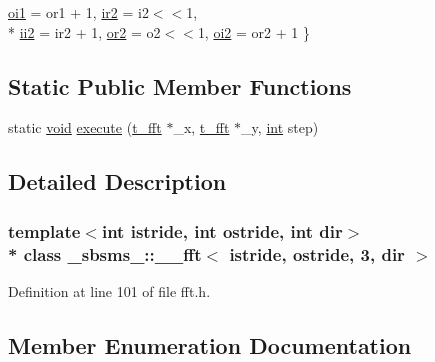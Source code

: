 \begin{DoxyCompactItemize}
\hyperlink{class__sbsms___1_1____fft_3_01istride_00_01ostride_00_013_00_01dir_01_4_a0eb5f1fdad137cbe9f2343823af3d271a56a14245903d6df0535b7a9f4fef7130}{oi1} = or1 + 1, 
\hyperlink{class__sbsms___1_1____fft_3_01istride_00_01ostride_00_013_00_01dir_01_4_a0eb5f1fdad137cbe9f2343823af3d271a440e0b07fe99cb841fff4e5fcd5d6a97}{ir2} = i2$<$$<$1, 
\\*
\hyperlink{class__sbsms___1_1____fft_3_01istride_00_01ostride_00_013_00_01dir_01_4_a0eb5f1fdad137cbe9f2343823af3d271a73def70a027fa8bf4473fa9ba34619a4}{ii2} = ir2 + 1, 
\hyperlink{class__sbsms___1_1____fft_3_01istride_00_01ostride_00_013_00_01dir_01_4_a0eb5f1fdad137cbe9f2343823af3d271a120f14705b7aa375238363a9d0d41ce9}{or2} = o2$<$$<$1, 
\hyperlink{class__sbsms___1_1____fft_3_01istride_00_01ostride_00_013_00_01dir_01_4_a0eb5f1fdad137cbe9f2343823af3d271aef8933758f3d4456b58bdbdca0ada200}{oi2} = or2 + 1
 \}
\end{DoxyCompactItemize}
\subsection*{Static Public Member Functions}
\begin{DoxyCompactItemize}
\item 
static \hyperlink{sound_8c_ae35f5844602719cf66324f4de2a658b3}{void} \hyperlink{class__sbsms___1_1____fft_3_01istride_00_01ostride_00_013_00_01dir_01_4_af43801124bd8c16f31037448e3ad1558}{execute} (\hyperlink{namespace__sbsms___af5c6f976b2da21c36853e3b0c5995a54}{t\+\_\+fft} $\ast$\+\_\+x, \hyperlink{namespace__sbsms___af5c6f976b2da21c36853e3b0c5995a54}{t\+\_\+fft} $\ast$\+\_\+y, \hyperlink{xmltok_8h_a5a0d4a5641ce434f1d23533f2b2e6653}{int} step)
\end{DoxyCompactItemize}


\subsection{Detailed Description}
\subsubsection*{template$<$int istride, int ostride, int dir$>$\\*
class \+\_\+sbsms\+\_\+\+::\+\_\+\+\_\+fft$<$ istride, ostride, 3, dir $>$}



Definition at line 101 of file fft.\+h.



\subsection{Member Enumeration Documentation}
